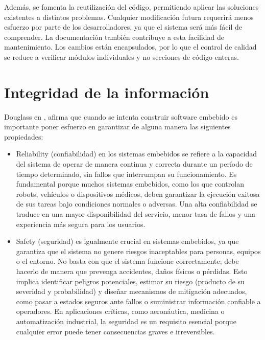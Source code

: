 Además, se fomenta la reutilización del código, permitiendo aplicar las soluciones existentes a distintos problemas. Cualquier modificación futura requerirá menos esfuerzo por parte de los desarrolladores, ya que el sistema será más fácil de comprender. La documentación también contribuye a esta facilidad de mantenimiento. Los cambios están encapsulados, por lo que el control de calidad se reduce a verificar módulos individuales y no secciones de código enteras.


\newpage





\section{Integridad de la información}

Douglass en \cite{douglass}, afirma que cuando se intenta construir software embebido es importante poner esfuerzo en garantizar de alguna manera las siguientes propiedades:

\begin{itemize}
\item Reliability (confiabilidad) en los sistemas embebidos se refiere a la capacidad del sistema de operar de manera continua y correcta durante un período de tiempo determinado, sin fallos que interrumpan su funcionamiento. Es fundamental porque muchos sistemas embebidos, como los que controlan robots, vehículos o dispositivos médicos, deben garantizar la ejecución exitosa de sus tareas bajo condiciones normales o adversas. Una alta confiabilidad se traduce en una mayor disponibilidad del servicio, menor tasa de fallos y una experiencia más segura para los usuarios.

\item Safety (seguridad) es igualmente crucial en sistemas embebidos, ya que garantiza que el sistema no genere riesgos inaceptables para personas, equipos o el entorno. No basta con que el sistema funcione correctamente; debe hacerlo de manera que prevenga accidentes, daños físicos o pérdidas. Esto implica identificar peligros potenciales, estimar su riesgo (producto de su severidad y probabilidad) y diseñar mecanismos de mitigación adecuados, como pasar a estados seguros ante fallos o suministrar información confiable a operadores. En aplicaciones críticas, como aeronáutica, medicina o automatización industrial, la seguridad es un requisito esencial porque cualquier error puede tener consecuencias graves e irreversibles.
\end{itemize}

